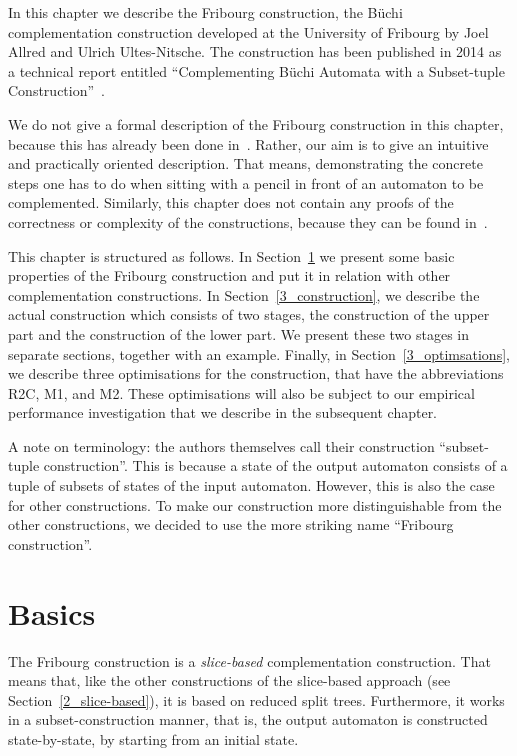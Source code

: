 In this chapter we describe the Fribourg construction, the Büchi complementation construction developed at the University of Fribourg by Joel Allred and Ulrich Ultes-Nitsche. The construction has been published in 2014 as a technical report entitled ``Complementing Büchi Automata with a Subset-tuple Construction''~\cite{2014_joel_ulrich}.

We do not give a formal description of the Fribourg construction in this chapter, because this has already been done in~\cite{2014_joel_ulrich}. Rather, our aim is to give an intuitive and practically oriented description. That means, demonstrating the concrete steps one has to do when sitting with a pencil in front of an automaton to be complemented. Similarly, this chapter does not contain any proofs of the correctness or complexity of the constructions, because they can be found in~\cite{2014_joel_ulrich}.

This chapter is structured as follows. In Section~\ref{3_basics} we present some basic properties of the Fribourg construction and put it in relation with other complementation constructions. In Section~\ref{3_construction}, we describe the actual construction which consists of two stages, the construction of the upper part and the construction of the lower part. We present these two stages in separate sections, together with an example. Finally, in Section~\ref{3_optimsations}, we describe three optimisations for the construction, that have the abbreviations R2C, M1, and M2. These optimisations will also be subject to our empirical performance investigation that we describe in the subsequent chapter.

A note on terminology: the authors themselves call their construction ``subset-tuple construction''. This is because a state of the output automaton consists of a tuple of subsets of states of the input automaton. However, this is also the case for other constructions. To make our construction more distinguishable from the other constructions, we decided to use the more striking name ``Fribourg construction''.

\section{Basics}
\label{3_basics}
The Fribourg construction is a \textit{slice-based} complementation construction. That means that, like the other constructions of the slice-based approach (see Section~\ref{2_slice-based}), it is based on reduced split trees. Furthermore, it works in a subset-construction manner, that is, the output automaton is constructed state-by-state, by starting from an initial state.

